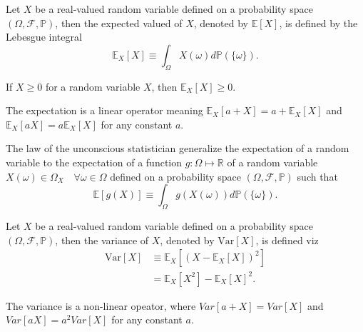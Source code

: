 \begin{definition}
	\label{def:expectation}
	Let $X$ be a real-valued random variable defined on a probability space $(\Omega, \mathcal{F},\mathbb{P})$, then the expected valued of $X$, denoted by $\mathbb{E}[X]$, is defined by the Lebesgue integral~\citep{taboga2021}
	\begin{equation}
		\mathbb{E}_X[X]\equiv \int _\Omega X(\omega)d\mathbb{P}(\{\omega\}).
		\label{eq:expected_value}
	\end{equation}
\end{definition}
\begin{theorem}
	If $X\geq 0$ for a random variable $X$, then $\mathbb{E}_X[X]\geq 0$.
\end{theorem}
\begin{theorem}
	The expectation is a linear operator meaning $\mathbb{E}_X[a+X] = a+\mathbb{E}_X[X]$ and $\mathbb{E}_X[aX] = a\mathbb{E}_X[X]$ for any constant $a$.
\end{theorem}
\begin{theorem}
	The law of the unconscious statistician generalize the expectation of a random variable to the expectation of a function $g: \Omega \mapsto \mathbb{R}$ of a random variable $X(\omega)\in \Omega_X\quad \forall \omega \in \Omega$ defined on a probability space $(\Omega, \mathcal{F},\mathbb{P})$ such that
	\begin{equation}
		\mathbb{E}[g(X)]\equiv \int _\Omega g(X(\omega))d\mathbb{P}(\{\omega\}).
		\label{eq:expected_value2}
	\end{equation}
\end{theorem}

\begin{definition}[Variance]
	\label{def:variance}
	Let $X$ be a real-valued random variable defined on a probability space $(\Omega, \mathcal{F},\mathbb{P})$, then the variance of $X$, denoted by $\text{Var}[X]$, is defined viz
	\begin{equation}
		\begin{split}
			\text{Var}[X]&\equiv \mathbb{E}_X[(X-\mathbb{E}_X[X])^2]\\
			&= \mathbb{E}_X[X^2]-\mathbb{E}_X[X]^2.
		\end{split}
	\end{equation}
\end{definition}
\begin{theorem}
	The variance is a non-linear opeator, where $Var[a+X]=Var[X]$ and $Var[aX]=a^2Var[X]$ for any constant $a$.
\end{theorem}


